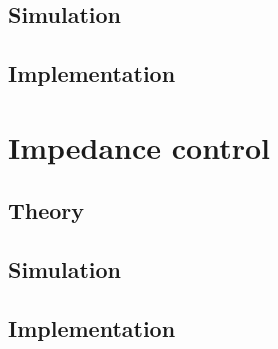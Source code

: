 \subsection{Simulation}
\subsection{Implementation}

\newpage
\section{Impedance control}
\subsection{Theory}
\subsection{Simulation}
\subsection{Implementation}